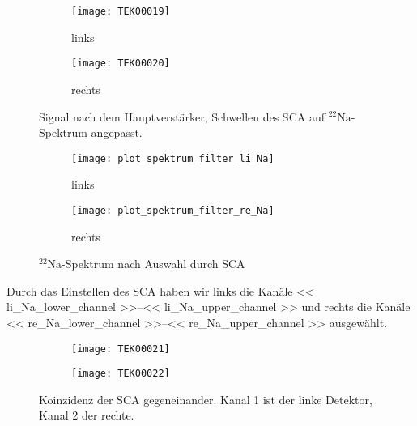 \documentclass[11pt, ngerman, fleqn, DIV=15, headinclude, BCOR=2cm]{scrreprt}
\begin{document}
\begin{figure}
	\centering
	\begin{subfigure}{0.49 \textwidth}
		\texttt{[image: TEK00019]}
		\caption{%
			links
		}
		\label{fig:slow_signal_sca_eingestellt-li}
	\end{subfigure}
	\begin{subfigure}{0.49 \textwidth}
		\texttt{[image: TEK00020]}
		\caption{%
			rechts
		}
		\label{fig:slow_signal_sca_eingestellt-re}
	\end{subfigure}
	\caption{%
		Signal nach dem Hauptverstärker, Schwellen des SCA auf
		$^{22}\text{Na}$-Spektrum angepasst.
	}
	\label{fig:slow_signal_sca_eingestellt}
\end{figure}

\begin{figure}
	\centering
	\begin{subfigure}{0.49 \textwidth}
		\texttt{[image: plot\_spektrum\_filter\_li\_Na]}
		\caption{%
			links
		}
		\label{fig:slow_sca_eingestellt-li_plot}
	\end{subfigure}
	\begin{subfigure}{0.49 \textwidth}
		\texttt{[image: plot\_spektrum\_filter\_re\_Na]}
		\caption{%
			rechts
		}
		\label{fig:slow_sca_eingestellt-re_plot}
	\end{subfigure}
	\caption{%
		$^{22}\text{Na}$-Spektrum nach Auswahl durch SCA
	}
	\label{fig:slow_signal_sca_eingestellt_plot}
\end{figure}

Durch das Einstellen des SCA haben wir links die Kanäle
\numrange{<< li_Na_lower_channel >>}{<< li_Na_upper_channel >>} und rechts
die Kanäle
\numrange{<< re_Na_lower_channel >>}{<< re_Na_upper_channel >>} ausgewählt.

\begin{figure}
	\centering
	\begin{subfigure}{0.49 \textwidth}
		\texttt{[image: TEK00021]}
	\end{subfigure}
	\begin{subfigure}{0.49 \textwidth}
		\texttt{[image: TEK00022]}
	\end{subfigure}
	\caption{%
		Koinzidenz der SCA gegeneinander. Kanal 1 ist der linke
		Detektor, Kanal 2 der rechte.
	}
	\label{fig:slow_signal_sca_koinzidenz}
\end{figure}


\end{document}
